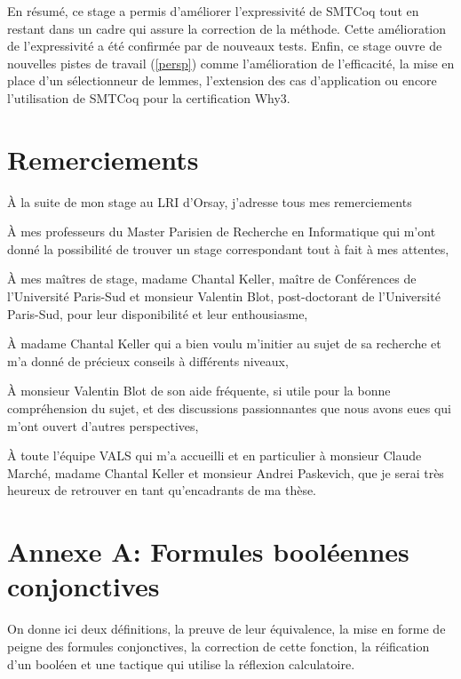 \documentclass[11pt]{article}
\begin{document}
En résumé, ce stage a permis d'améliorer l'expressivité de SMTCoq tout en restant dans un cadre qui assure la correction de la méthode. Cette amélioration de l'expressivité a été confirmée par de nouveaux tests. Enfin, ce stage ouvre de nouvelles pistes de travail (\ref{persp}) comme l'amélioration de l'efficacité, la mise en place d'un sélectionneur de lemmes, l'extension des cas d'application ou encore l'utilisation de SMTCoq pour la certification Why3.

\newpage
\pagestyle{empty}
\section*{Remerciements}

\bigbreak\bigbreak\bigbreak

À la suite de mon stage au LRI d'Orsay, j'adresse tous mes remerciements \bigbreak\bigbreak

À mes professeurs du Master Parisien de Recherche en Informatique qui m'ont donné la possibilité de trouver un stage correspondant tout à fait à mes attentes, \bigbreak\bigbreak

À mes maîtres de stage, madame Chantal Keller, maître de Conférences de l'Université Paris-Sud  et monsieur Valentin Blot, post-doctorant de l'Université Paris-Sud, pour leur disponibilité et leur enthousiasme,

À madame Chantal Keller qui a bien voulu m'initier au sujet de sa recherche et m'a donné de précieux conseils à différents niveaux,

À monsieur Valentin Blot de son aide fréquente, si utile pour la bonne compréhension du sujet, et des discussions passionnantes que nous avons eues qui m'ont ouvert d'autres perspectives, \bigbreak\bigbreak

À toute l'équipe VALS qui m'a accueilli et en particulier à monsieur Claude Marché, madame Chantal Keller et monsieur Andrei Paskevich, que je serai très heureux de retrouver en tant qu'encadrants de ma thèse.


\newpage
\renewcommand\refname{Bibliographie}
\nocite{*}
{}




\section*{Annexe A: Formules booléennes conjonctives}

On donne ici deux définitions, la preuve de leur équivalence, la mise en forme de peigne des formules conjonctives, la correction de cette fonction, la réification d'un booléen et une tactique qui utilise la réflexion calculatoire.
\end{document}
